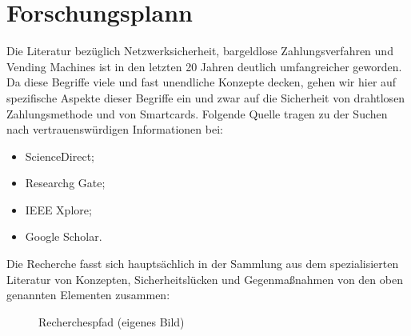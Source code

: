 \section{Forschungsplann}

Die Literatur bezüglich Netzwerksicherheit, bargeldlose Zahlungsverfahren und Vending Machines ist 
in den letzten 20 Jahren deutlich umfangreicher geworden. Da diese Begriffe viele und fast unendliche 
Konzepte decken, gehen wir hier auf spezifische Aspekte dieser Begriffe ein und zwar 
auf die Sicherheit von drahtlosen Zahlungsmethode und von Smartcards. Folgende Quelle tragen zu der
Suchen nach vertrauenswürdigen Informationen bei:

\begin{itemize}
    \item ScienceDirect;
    \item Researchg Gate;
    \item IEEE Xplore;
    \item Google Scholar.
\end{itemize}

Die Recherche fasst sich hauptsächlich in der Sammlung aus dem spezialisierten Literatur von Konzepten,
Sicherheitslücken und Gegenmaßnahmen von den oben genannten Elementen zusammen:

\vfill
\begin{figure}[htb]
    \caption{Recherchespfad (eigenes Bild)}
    \label{fig:diagramrecherche}
\end{figure}
\vfill
